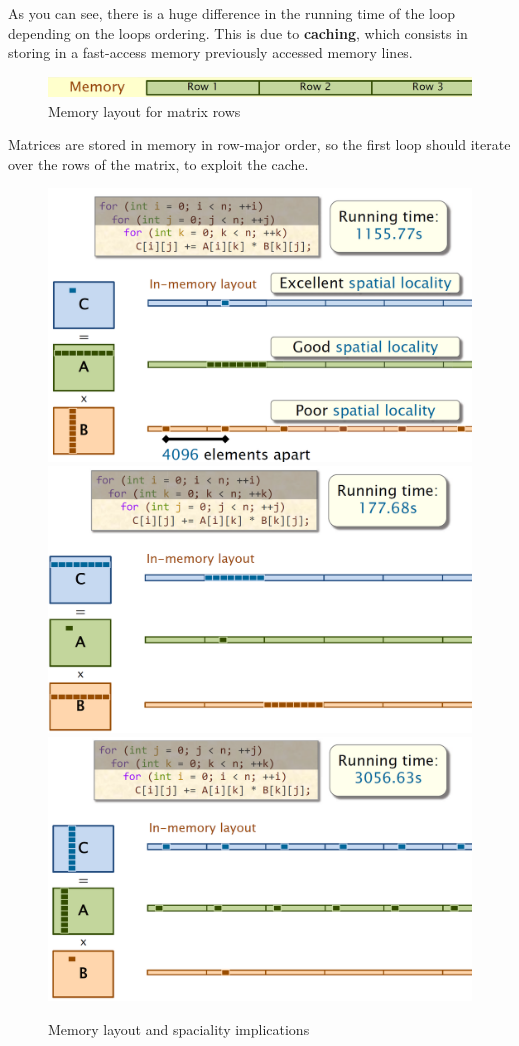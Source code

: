 As you can see, there is a huge difference in the running time of the loop depending on the loops ordering. This is due to \textbf{caching}, which consists in storing in a fast-access memory previously accessed memory lines.

\newpage
\begin{figure}[htbp]
   \centering
   \includegraphics{images/02/rowmajor.png}
   \caption{Memory layout for matrix rows}
   \label{fig:02/rowmajor}
\end{figure}
Matrices are stored in memory in row-major order, so the first loop should iterate over the rows of the matrix, to exploit the cache.

\begin{figure}[htbp]
   \centering
   \includegraphics[width=0.49\columnwidth]{images/02/memory_layout1.png}
   \includegraphics[width=0.49\columnwidth]{images/02/memory_layout2.png}\\
   \includegraphics[width=0.49\columnwidth]{images/02/memory_layout3.png}
   \caption{Memory layout and spaciality implications}
   \label{fig:02/spaciality}
\end{figure}

